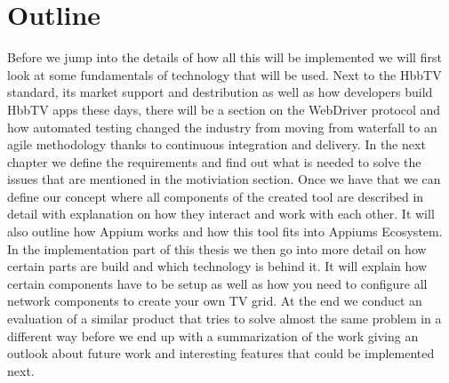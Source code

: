\section{Outline\label{sec:outline}}

Before we jump into the details of how all this will be implemented we will first look at some fundamentals
of technology that will be used. Next to the HbbTV standard, its market support and destribution as well
as how developers build HbbTV apps these days, there will be a section on the WebDriver protocol and how
automated testing changed the industry from moving from waterfall to an agile methodology thanks to
continuous integration and delivery. In the next chapter we define the requirements and find out what is
needed to solve the issues that are mentioned in the motiviation section. Once we have that we can define
our concept where all components of the created tool are described in detail with explanation on how they
interact and work with each other. It will also outline how Appium works and how this tool fits into
Appiums Ecosystem. In the implementation part of this thesis we then go into more detail on how certain
parts are build and which technology is behind it. It will explain how certain components have to be
setup as well as how you need to configure all network components to create your own TV grid. At the
end we conduct an evaluation of a similar product that tries to solve almost the same problem in a
different way before we end up with a summarization of the work giving an outlook about future work and
interesting features that could be implemented next.
